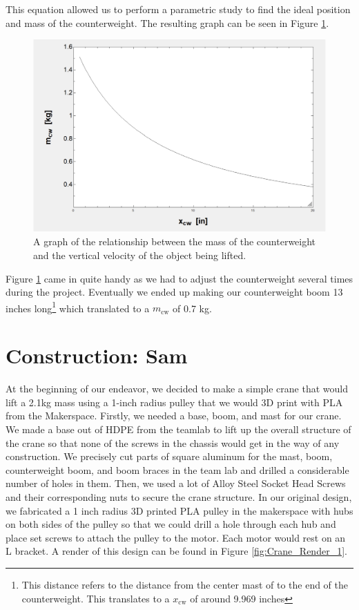 \documentclass[letterpaper, 12pt]{article}
\begin{document}
This equation allowed us to perform a parametric study to find the ideal position and mass of the counterweight. The resulting graph can be seen in Figure \ref{fig:Counter Weight.png}.
\begin{figure}[H]
    \centering
    \includegraphics[width =.55\linewidth]{Counter Weight.png}
    \caption{A graph of the relationship between the mass of the counterweight and the vertical velocity of the object being lifted.}
    \label{fig:Counter Weight.png}
\end{figure}

Figure \ref{fig:Counter Weight.png} came in quite handy as we had to adjust the counterweight several times during the project.
Eventually we ended up making our counterweight boom 13 inches long\footnote{This distance refers to the distance from the center mast of to the end of the counterweight. This translates to a $x_{\text{cw}}$ of around 9.969 inches} which translated to a $m_{\text{cw}}$ of 0.7 kg.

\section{Construction: Sam }
At the beginning of our endeavor, we decided to make a simple crane that would lift a 2.1kg mass using a 1-inch radius pulley that we would 3D print with PLA from the Makerspace.  
Firstly, we needed a base, boom, and mast for our crane.  
We made a base out of HDPE from the teamlab to lift up the overall structure of the crane so that none of the screws in the chassis would get in the way of any construction.  
We precisely cut parts of square aluminum for the mast, boom, counterweight boom, and boom braces in the team lab and drilled a considerable number of holes in them. 
Then, we used a lot of Alloy Steel Socket Head Screws and their corresponding nuts to secure the crane structure.  
In our original design, we fabricated a 1 inch radius 3D printed PLA pulley in the makerspace with hubs on both sides of the pulley so that we could drill a hole through each hub and place set screws to attach the pulley to the motor.  
Each motor would rest on an L bracket. A render of this design can be found in Figure \ref{fig:Crane_Render_1}.
\end{document}
